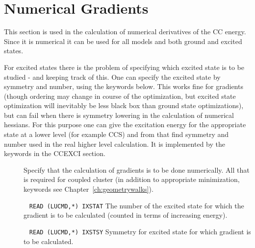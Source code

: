 %
\section{Numerical Gradients }\label{sec:ccgr}
%

This section is used in the calculation of numerical derivatives
of the CC energy. Since it is numerical it can be used for all models
and both ground and excited states.

For excited states there is the problem of specifying 
which excited state is to be studied - and keeping track of this.
One can specify the excited state by symmetry and number, using the keywords below.
This works fine for gradients (though ordering may change in course of the
optimization, but excited state optimization will inevitably be less black box
than ground state optimizations), but can fail when there is symmetry lowering
in the calculation of numerical hessians. 
For this purpose one can give the excitation energy for the 
appropriate state at a lower level 
(for example CCS) and from that find symmetry and number used 
in the real higher level calculation.
It is implemented by the keywords in the CCEXCI section.

\begin{description}

\item[] 

Specify that the calculation of gradients is to be done numerically.
All that is required for coupled cluster (in addition to appropriate 
minimization, keywords see Chapter~\ref{ch:geometrywalks}).

\item[] \verb| | \newline
\verb|READ (LUCMD,*) IXSTAT|\newline
The number of the excited state for which the  gradient is to be calculated 
(counted in terms of increasing energy).

\item[]  \verb| | \newline
\verb|READ (LUCMD,*) IXSTSY|\newline
Symmetry for excited state for which gradient is to be calculated.


\end{description}
